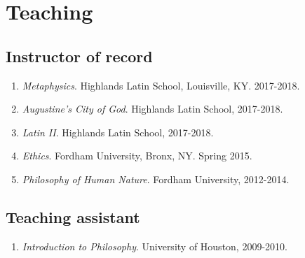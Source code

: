 \section{Teaching}
\subsection{Instructor of record}
\begin{enumerate}
\item \emph{Metaphysics}. Highlands Latin School, Louisville, KY. 2017-2018.
\item \emph{Augustine's City of God}. Highlands Latin School, 2017-2018.
\item \emph{Latin II}. Highlands Latin School, 2017-2018.
\item \emph{Ethics}. Fordham University, Bronx, NY. Spring 2015.
\item \emph{Philosophy of Human Nature}. Fordham University, 2012-2014.
	\setcounter{courseCounter}{\value{enumi}}	%
\end{enumerate}

\subsection{Teaching assistant}
\begin{enumerate}
	\setcounter{enumi}{\value{courseCounter}}	%
	\item \emph{Introduction to Philosophy}. University of Houston, 2009-2010.
	\setcounter{courseCounter}{\value{enumi}}	%
\end{enumerate}
